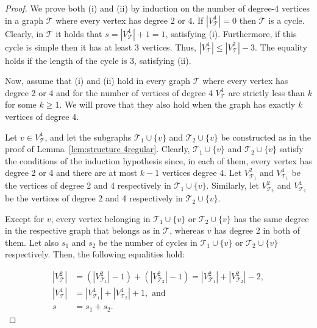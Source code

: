 \documentclass{article}
\begin{document}
        \begin{proof}
            We prove both (i) and (ii) by induction on the number of degree-$4$ vertices in a graph $\mathcal{T}$ where every vertex has degree $2$ or $4$.
            If $|V^4_{\mathcal{T}}|=0$ then $\mathcal{T}$ is a cycle. 
            Clearly, in $\mathcal{T}$ it holds that $s=|V^4_{\mathcal{T}}|+1=1$, satisfying (i).
            Furthermore, if this cycle is simple then it has at least 3 vertices.
            Thus, $|V^4_{\mathcal{T}}|\leq |V^2_{\mathcal{T}}|-3$. 
            The equality holds if the length of the cycle is 3, satisfying (ii).
            
        
            Now, assume that (i) and (ii) hold in  every graph $\mathcal{T}$ where every vertex has degree 2 or 4 and for the number of vertices of degree 4 $V^4_{\mathcal{T}}$  are strictly less than $k$ for some $k \geq 1$. 
            We will prove that they also hold when the graph has exactly $k$ vertices of degree $4$. 
            
            Let $v\in V^4_{\mathcal{T}}$, and let the subgraphs $\mathcal{T}_1\cup\{v\}$ and $\mathcal{T}_2\cup\{v\}$ be constructed as in the proof of Lemma~\ref{lem:structure 4regular}.
            Clearly, $\mathcal{T}_1\cup\{v\}$ and $\mathcal{T}_2\cup\{v\}$ satisfy the conditions of the induction hypothesis since, in each of them, every vertex has degree 2 or 4 and there are at most $k-1$ vertices degree 4.
            Let $V^2_{\mathcal{T}_1}$ and $V^4_{\mathcal{T}_1}$ be the vertices of degree 2 and 4 respectively in $\mathcal{T}_1\cup\{v\}$. 
            Similarly, let $V^2_{\mathcal{T}_2}$ and $V^4_{\mathcal{T}_2}$ be the vertices of degree 2 and 4 respectively in $\mathcal{T}_2\cup\{v\}$.
            
            Except for $v$, every vertex belonging in $\mathcal{T}_1\cup\{v\}$ or $\mathcal{T}_2\cup\{v\}$ has the same degree in the respective graph that belongs as in $\mathcal{T}$, whereas $v$ has degree 2 in both of them. 
            Let also  $s_1$ and $s_2$ be the number of cycles in $\mathcal{T}_1\cup\{v\}$ or $\mathcal{T}_2\cup\{v\}$ respectively. 
            Then, the following equalities hold:
        
        
            \begin{align*}
                |V^2_{\mathcal{T}}| &= (|V^2_{\mathcal{T}_1}|-1)+(|V^2_{\mathcal{T}_2}|-1) = |V^2_{\mathcal{T}_1}|+|V^2_{\mathcal{T}_2}|-2,  \\
                |V^4_{\mathcal{T}}| &= |V^4_{\mathcal{T}_1}|+|V^4_{\mathcal{T}_2}|+1, \text{ and } \\
                s &= s_1+s_2.
            \end{align*}
        

\end{proof}
\end{document}

